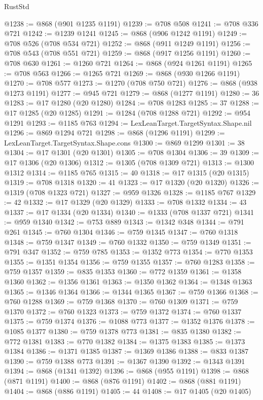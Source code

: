 \begin{lexlean}{RustStd}
\begin{coremodule}
@1238 := @868 (@901 @1235 @1191)
@1239 := @708 @508
@1241 := @708 @336 @721
@1242 := @1239 @1241
@1245 := @868 (@906 @1242 @1191)
@1249 := @708 @526 (@708 @534 @721)
@1252 := @868 (@911 @1249 @1191)
@1256 := @708 @543 (@708 @551 @721)
@1259 := @868 (@917 @1256 @1191)
@1260 := @708 @630
@1261 := @1260 @721
@1264 := @868 (@924 @1261 @1191)
@1265 := @708 @563
@1266 := @1265 @721
@1269 := @868 (@930 @1266 @1191)
@1270 := @708 @577
@1273 := @1270 (@708 @750 @721)
@1276 := @868 (@938 @1273 @1191)
@1277 := @945 @721
@1279 := @868 (@1277 @1191)
@1280 := 36
@1283 := @17 @1280 (@20 @1280)
@1284 := @708 @1283
@1285 := 37
@1288 := @17 @1285 (@20 @1285)
@1291 := @1284 (@708 @1288 @721)
@1292 := @954 @1291
@1293 := @1185 @763
@1294 := LexLeanTarget.TargetSyntax.Shape.nil
@1296 := @869 @1294 @721
@1298 := @868 (@1296 @1191)
@1299 := LexLeanTarget.TargetSyntax.Shape.cons
@1300 := @869 @1299
@1301 := 38
@1304 := @17 @1301 (@20 @1301)
@1305 := @708 @1304
@1306 := 39
@1309 := @17 @1306 (@20 @1306)
@1312 := @1305 (@708 @1309 @721)
@1313 := @1300 @1312
@1314 := @1185 @765
@1315 := 40
@1318 := @17 @1315 (@20 @1315)
@1319 := @708 @1318
@1320 := 41
@1323 := @17 @1320 (@20 @1320)
@1326 := @1319 (@708 @1323 @721)
@1327 := @959 @1326
@1328 := @1185 @767
@1329 := 42
@1332 := @17 @1329 (@20 @1329)
@1333 := @708 @1332
@1334 := 43
@1337 := @17 @1334 (@20 @1334)
@1340 := @1333 (@708 @1337 @721)
@1341 := @959 @1340
@1342 := @753 @889
@1343 := @1342 @348
@1344 := @791 @261
@1345 := @760 @1304
@1346 := @759 @1345
@1347 := @760 @1318
@1348 := @759 @1347
@1349 := @760 @1332
@1350 := @759 @1349
@1351 := @791 @347
@1352 := @759 @785
@1353 := @1352 @773
@1354 := @770 @1353
@1355 := @1351 @1354
@1356 := @759 @1355
@1357 := @760 @1283
@1358 := @759 @1357
@1359 := @835 @1353
@1360 := @772 @1359
@1361 := @1358 @1360
@1362 := @1356 @1361
@1363 := @1350 @1362
@1364 := @1348 @1363
@1365 := @1346 @1364
@1366 := @1344 @1365
@1367 := @759 @1366
@1368 := @760 @1288
@1369 := @759 @1368
@1370 := @760 @1309
@1371 := @759 @1370
@1372 := @760 @1323
@1373 := @759 @1372
@1374 := @760 @1337
@1375 := @759 @1374
@1376 := @1088 @773
@1377 := @1352 @1376
@1378 := @1085 @1377
@1380 := @759 @1378 @773
@1381 := @835 @1380
@1382 := @772 @1381
@1383 := @770 @1382
@1384 := @1375 @1383
@1385 := @1373 @1384
@1386 := @1371 @1385
@1387 := @1369 @1386
@1388 := @833 @1387
@1390 := @759 @1388 @773
@1391 := @1367 @1390
@1392 := @1343 @1391
@1394 := @868 (@1341 @1392)
@1396 := @868 (@955 @1191)
@1398 := @868 (@871 @1191)
@1400 := @868 (@876 @1191)
@1402 := @868 (@881 @1191)
@1404 := @868 (@886 @1191)
@1405 := 44
@1408 := @17 @1405 (@20 @1405)

\end{coremodule}
\end{lexlean}
